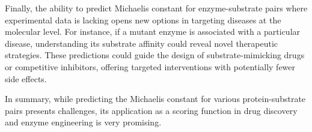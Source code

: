 Finally, the ability to predict Michaelis constant for enzyme-substrate pairs where experimental data 
is lacking opens new options in targeting diseases at the molecular level. For instance, if a mutant enzyme 
is associated with a particular disease, understanding its substrate affinity could reveal novel 
therapeutic strategies. These predictions could guide the design of substrate-mimicking drugs or 
competitive inhibitors, offering targeted interventions with potentially fewer side effects.

In summary, while predicting the Michaelis constant for various protein-substrate pairs presents challenges, 
its application as a scoring function in drug discovery and enzyme engineering is very promising.